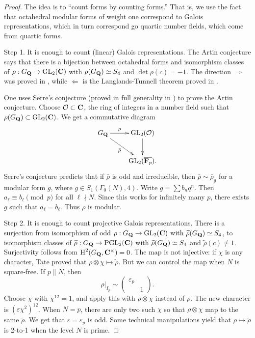\begin{proof}
The idea is to ``count forms by counting forms.'' That is, we use the fact 
that octahedral modular forms of weight one correspond to Galois 
representations, which in turn correspond go quartic number fields, which 
come from quartic forms. 

Step 1. It is enough to count (linear) Galois representations. The Artin 
conjecture says that there is a bijection between octahedral forms and 
isomorphism classes of $\rho:G_{\mathbf{Q}} \to \operatorname{GL}_2(\mathbf{C})$ with 
$\rho(G_{\mathbf{Q}})\simeq S_4$ and $\det\rho(c)=-1$. The direction $\Rightarrow$ was 
proved in \cite{ds74}, while $\Leftarrow$ is the Langlands-Tunnell theorem 
proved in \cite{t81}.

One uses Serre's conjecture (proved in full generality in 
\cite{kw09-i,kw09-ii}) to prove the Artin conjecture. Choose 
$\mathcal{O}\subset \mathbf{C}$, the ring of integers in a number field such that 
$\rho(G_{\mathbf{Q}})\subset \operatorname{GL}_2(\mathbf{C})$. We get a commutative diagram 
\[\xymatrix{
  G_\dQ \ar[r]^-\rho \ar[dr]_-{\bar\rho} 
    & \generallinear_2(\cO) \ar[d] \\ 
  & \generallinear_2(\overline{\dF_p}) .
}\]
Serre's conjecture predicts that if $\bar\rho$ is odd and irreducible, then 
$\bar\rho\sim \bar\rho_g$ for a modular form $g$, where 
$g\in S_1(\Gamma_0(N),4)$. Write $g=\sum b_n q^n$. Then 
$a_\ell\equiv b_\ell\pmod p$ for all $\ell\nmid N$. Since this works for 
infinitely many $p$, there exists $g$ such that $a_\ell=b_\ell$. Thus 
$\rho$ is modular. 

Step 2. It is enough to count projective Galois representations. There is 
a surjection from isomorphism of odd $\rho:G_{\mathbf{Q}}\to \operatorname{GL}_2(\mathbf{C})$ 
with $\widetilde\rho(G_{\mathbf{Q}})\simeq S_4$, to isomorphism classes of 
$\widetilde\rho:G_{\mathbf{Q}}\to \operatorname{PGL}_2(\mathbf{C})$ with 
$\widetilde\rho(G_{\mathbf{Q}})\simeq S_4$ and $\widetilde\rho(c)\ne 1$. Surjectivity 
follows from $\operatorname{H}^2(G_{\mathbf{Q}},\mathbf{C}^\times)=0$. The map is not injective: if 
$\chi$ is any character, Tate proved that 
$\rho\otimes\chi\mapsto\widetilde\rho$. But we can control the map when $N$ is 
square-free. If $p\| N$, then 
\[
  \rho|_{I_p} \sim \begin{pmatrix} \varepsilon_p \\ & 1 \end{pmatrix} .
\]
Choose $\chi$ with $\chi^{12}=1$, and apply this with $\rho\otimes\chi$ 
instead of $\rho$. The new character is $(\varepsilon\chi^2)^{12}$. When 
$N=p$, there are only two such $\chi$ so that $\rho\otimes\chi$ map to the 
same $\widetilde\rho$. We get that $\varepsilon=\varepsilon_p$ is odd. Some 
technical manipulations yield that $\rho\mapsto \widetilde\rho$ is 
2-to-1 when the level $N$ is prime. 


\end{proof}
